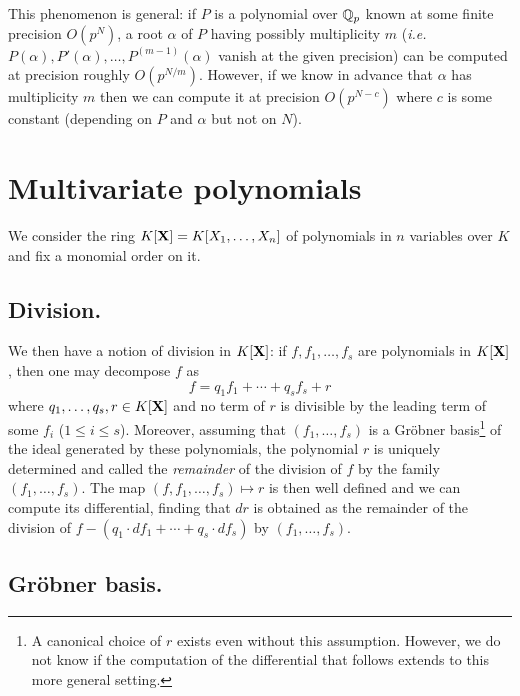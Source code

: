 \documentclass{sig-alternate}
\begin{document}
{This phenomenon is general: if $P$ is a polynomial over $\mathbb Q_p$ known at 
some finite precision $O(p^N)$, a root $\alpha$ of $P$ having possibly 
multiplicity $m$ (\emph{i.e.} $P(\alpha), P'(\alpha), \ldots, P^{(m-1)} 
(\alpha)$ vanish at the given precision) can be computed at precision 
roughly $O(p^{N/m})$. However, if we know in advance that $\alpha$ has 
multiplicity $m$ then we can compute it at precision $O(p^{N-c})$ 
where $c$ is some constant (depending on $P$ and $\alpha$ but not on
$N$).

\section{Multivariate polynomials}
\label{sec:multivar}

We consider the ring $K[\mathbf X] = K[X_1, \ldots, X_n]$ of polynomials in $n$
variables over $K$ and fix a monomial order on it. 

\subsection*{Division.}

We then have a notion of division in $K[\mathbf X]$: if $f, f_1, \ldots, f_s$ 
are polynomials in $K[\mathbf X]$, then one may decompose $f$ as
$$f = q_1 f_1 + \cdots + q_s f_s + r$$
where $q_1, \ldots, q_s, r \in K[\mathbf X]$ and no term of $r$ is divisible
by the leading term of some $f_i$ ($1 \leq i \leq s$). Moreover, assuming
that $(f_1, \ldots, f_s)$ is a Gr\"obner basis\footnote{A canonical choice of $r$ exists even without this
assumption. However, we do not know
if the computation of the differential that follows extends to this more
general setting.} of the ideal generated by these polynomials, the 
polynomial $r$ is uniquely determined and called the \emph{remainder} of 
the division of $f$ by the family $(f_1, \ldots, f_s)$. The map 
$(f, f_1, \ldots, f_s) \mapsto r$ is then well defined and we can compute its differential,
finding that $dr$ is obtained as the remainder of the division of $f - (q_1 
\cdot d f_1 + \cdots + q_s \cdot d f_s)$ by $(f_1, \ldots, f_s)$.

\subsection*{Gr\"obner basis.}

}
\end{document}
